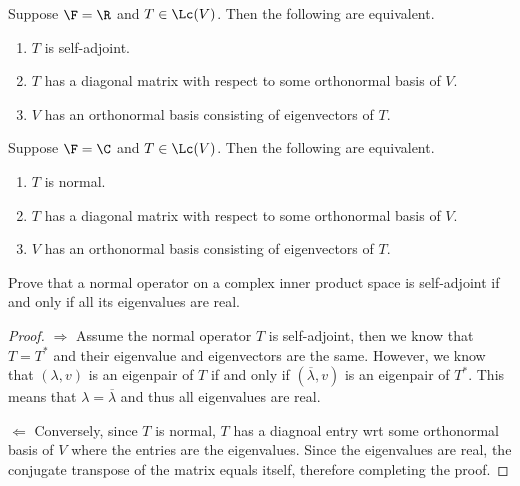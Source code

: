 \documentclass{extarticle}
\begin{document}
\begin{thm}[\textcolor{red}{REAL SPECTRAL THEOREM}]
Suppose \(\F = \R\) and \(T \in \Lc(V)\). Then the following are equivalent.
\begin{enumerate}[label=(\alph*)]
    \item \(T\) is self-adjoint.
    \item \(T\) has a diagonal matrix with respect to some orthonormal basis of \(V\).
    \item \(V\) has an orthonormal basis consisting of eigenvectors of \(T\).
\end{enumerate}
\end{thm}

\begin{thm}[\textcolor{red}{COMPLEX SPECTRAL THEOREM}]
    Suppose \(\F = \C\) and \(T \in \Lc(V)\). Then the following are equivalent.
    \begin{enumerate}[label=(\alph*)]
        \item \(T\) is normal.
        \item \(T\) has a diagonal matrix with respect to some orthonormal basis of \(V\).
        \item \(V\) has an orthonormal basis consisting of eigenvectors of \(T\).
    \end{enumerate}
\end{thm}


\newpage
{}


\begin{problem}{1}
    Prove that a normal operator on a complex inner product space is self-adjoint if and only if
    all its eigenvalues are real.
\end{problem}

\begin{proof}
\(\Rightarrow\) Assume the normal operator \(T\) is self-adjoint, then we know that \(T = T^*\) and
their eigenvalue and eigenvectors are the same. However, we know that \((\lambda, v)\) is an eigenpair
of \(T\) if and only if \((\overline{\lambda}, v)\) is an eigenpair of \(T^*\). This means that
\(\lambda = \overline{\lambda}\) and thus all eigenvalues are real.

\(\Leftarrow\) Conversely, since \(T\) is normal, \(T\) has a diagnoal entry wrt some orthonormal
basis of \(V\) where the entries are the eigenvalues. Since the eigenvalues are real, the conjugate transpose of
the matrix equals itself, therefore completing the proof.
\end{proof}
\end{document}

